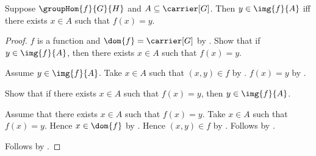 \begin{proposition}\label{group_hom_image_iff}
    Suppose $\groupHom{f}{G}{H}$ and $A\subseteq\carrier[G]$.
    Then $y\in\img{f}{A}$ iff
        there exists $x\in A$ such that $f(x)=y$.
\end{proposition}
\begin{proof}
    $f$ is a function and $\dom{f}=\carrier[G]$ by
        .
    Show that if $y\in\img{f}{A}$, then there exists $x\in A$
        such that $f(x)=y$.
    \begin{subproof}
        Assume $y\in\img{f}{A}$.
        Take $x\in A$ such that $(x,y)\in f$ by
            .
        $f(x)=y$ by .
    \end{subproof}
    Show that if there exists $x\in A$ such that $f(x)=y$, then
        $y\in\img{f}{A}$.
    \begin{subproof}
        Assume that there exists $x\in A$ such that $f(x)=y$.
        Take $x\in A$ such that $f(x)=y$.
        Hence $x\in\dom{f}$ by .
        Hence $(x,y)\in f$ by .
        Follows by .
    \end{subproof}
    Follows by \auto.
\end{proof}

